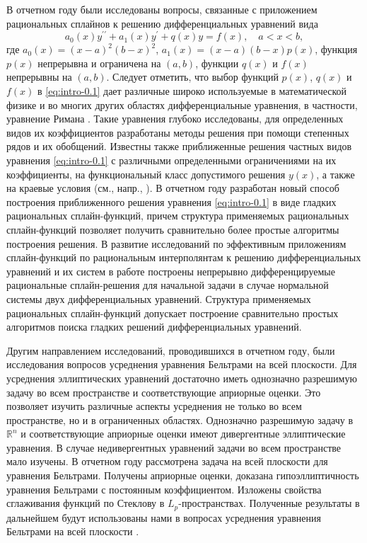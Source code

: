 В отчетном году были исследованы вопросы, связанные с приложением рациональных сплайнов к решению дифференциальных уравнений вида
\begin{equation}\label{eq:intro-0.1}
a_0(x) y^{\prime\prime}+a_1(x) y^\prime+q(x) y=f(x),\quad a< x<b,
\end{equation}
где $a_0(x)=(x-a)^2(b-x)^2$, $a_1(x)=(x-a)(b-x)p(x)$, функция $p(x)$ непрерывна и ограничена на $(a,b)$, функции $q(x)$ и $f(x)$ непрерывны на $(a,b)$.
Следует отметить, что выбор функций $p(x)$, $q(x)$ и $f(x)$ в \eqref{eq:intro-0.1} дает различные широко используемые в математической физике и во многих других областях дифференциальные уравнения, в частности, уравнение Римана \cite{bib:ark-1,bib:ark-2,bib:ark-3}. Такие уравнения глубоко
исследованы, для определенных видов их коэффициентов разработаны методы решения при помощи степенных рядов и их обобщений.
Известны также приближенные решения частных видов уравнения \eqref{eq:intro-0.1} с различными
определенными ограничениями на их коэффициенты, на функциональный класс допустимого
решения $y(x)$, а также на краевые условия (см., напр.,  \cite{bib:ark-4,bib:ark-5,bib:ark-6,bib:ark-7,bib:ark-8,bib:ark-9,bib:ark-10}).
В отчетном году разработан новый способ построения приближенного решения уравнения
\eqref{eq:intro-0.1} в виде гладких рациональных сплайн-функций, причем структура применяемых
рациональных сплайн-функций позволяет получить сравнительно более простые алгоритмы
построения решения.
В развитие исследований по эффективным приложениям сплайн-функций по рациональным
 интерполянтам к решению дифференциальных уравнений и их систем в работе \cite{bib:ark-19}
 построены непрерывно дифференцируемые рациональные сплайн-решения
 для начальной задачи в случае нормальной системы двух дифференциальных уравнений.
Структура применяемых рациональных сплайн-функций допускает построение сравнительно
простых алгоритмов поиска гладких решений дифференциальных уравнений.

Другим направлением исследований, проводившихся в отчетном году, были исследования вопросов усреднения уравнения Бельтрами на всей плоскости.
Для усреднения эллиптических уравнений достаточно иметь однозначно разрешимую задачу во всем пространстве и соответствующие априорные оценки. Это позволяет изучить различные  аспекты усреднения не только во всем пространстве, но и в ограниченных областях. Однозначно разрешимую задачу в $\mathbb{R}^n$ и соответствующие априорные оценки имеют дивергентные эллиптические уравнения. В случае недивергентных уравнений задачи во всем пространстве мало изучены.
В отчетном году рассмотрена задача на всей плоскости для уравнения Бельтрами. Получены априорные оценки, доказана гипоэллиптичность уравнения Бельтрами с постоянным коэффициентом. Изложены свойства сглаживания функций по Стеклову в $L_p$-пространствах. Полученные результаты в дальнейшем будут использованы нами в вопросах усреднения уравнения Бельтрами на всей плоскости .

